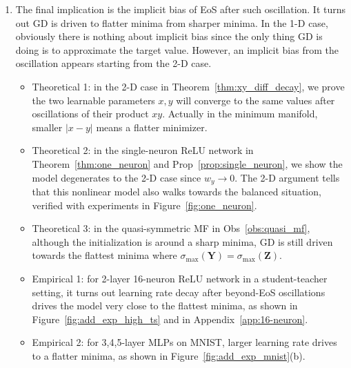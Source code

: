 \documentclass{article}
\theoremstyle{plain}
\theoremstyle{remark}
\def\bY{\mathbf{Y}}
\def\bZ{\mathbf{Z}}
\begin{document}
\begin{enumerate}[label=(\alph*)]
    \item The final implication is the implicit bias of EoS after such oscillation. It turns out GD is driven to flatter minima from sharper minima. In the 1-D case, obviously there is nothing about implicit bias since the only thing GD is doing is to approximate the target value. However, an implicit bias from the oscillation appears starting from the 2-D case.

    \begin{itemize}
        \item[\ding{117}] Theoretical 1: in the 2-D case in Theorem~\ref{thm:xy_diff_decay}, we prove the two learnable parameters $x,y$ will converge to the same values after oscillations of their product $xy$. Actually in the minimum manifold, smaller $|x-y|$ means a flatter minimizer.

        \item[\ding{117}] Theoretical 2: in the single-neuron ReLU network in Theorem~\ref{thm:one_neuron} and Prop~\ref{prop:single_neuron}, we show the model degenerates to the 2-D case since $w_y\rightarrow 0$. The 2-D argument tells that this nonlinear model also walks towards the balanced situation, verified with experiments in Figure~\ref{fig:one_neuron}.

        \item[\ding{117}] Theoretical 3: in the quasi-symmetric MF in Obs~\ref{obs:quasi_mf}, although the initialization is around a sharp minima, GD is still driven towards the flattest minima where $\sigma_{\max}(\bY)=\sigma_{\max}(\bZ)$.

        \item[\ding{93}] Empirical 1: for 2-layer 16-neuron ReLU network in a student-teacher setting, it turns out learning rate decay after beyond-EoS oscillations drives the model very close to the flattest minima, as shown in Figure~\ref{fig:add_exp_high_ts} and in Appendix~\ref{app:16-neuron}.

        \item[\ding{93}] Empirical 2: for 3,4,5-layer MLPs on MNIST, larger learning rate drives to a flatter minima, as shown in Figure~\ref{fig:add_exp_mnist}(b).
    \end{itemize}
\end{enumerate}




	
 
	



	
 
\end{document}
